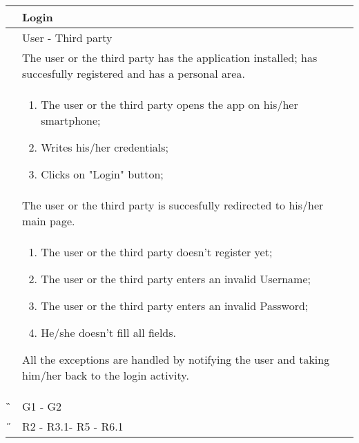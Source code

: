 \begin{center}
	\begin{longtable}{ | p{} | p{} | }
		\hline
		 \A &   Login \\ 

		\hline
		 \B &  User - Third party \\ 

		\hline
  		 \C &  The user or the third party has the application installed; has succesfully registered and has a personal area.\\ 

		\hline
		\D & \begin{enumerate}
			\item The user  or the third party opens the app on his/her smartphone;
			\item Writes his/her credentials;
			\item Clicks on "Login" button;
		\end{enumerate} \\

		\hline
		\E & The user  or the third party is succesfully redirected to his/her main page.\\

		\hline
		\F & \begin{enumerate}
			\item The user or the third party doesn't register yet;
			\item The user or the third party enters an invalid Username;
			\item The user or the third party enters an invalid Password;
			\item He/she doesn't fill all fields.
		\end{enumerate} All the exceptions are handled by notifying the user and taking him/her back to the login activity. \\
		
		\hline
		\G & G1 - G2\\

		\hline
		\H & R2 - R3.1- R5 - R6.1 \\
		\hline

	\end{longtable}
\end{center}